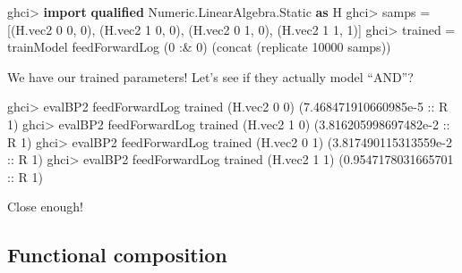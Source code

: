 \documentclass[]{article}
\newenvironment{Shaded}{}{}
\newcommand{\DataTypeTok}[1]{\textcolor[rgb]{0.56,0.13,0.00}{#1}}
\newcommand{\DecValTok}[1]{\textcolor[rgb]{0.25,0.63,0.44}{#1}}
\newcommand{\FloatTok}[1]{\textcolor[rgb]{0.25,0.63,0.44}{#1}}
\newcommand{\FunctionTok}[1]{\textcolor[rgb]{0.02,0.16,0.49}{#1}}
\newcommand{\KeywordTok}[1]{\textcolor[rgb]{0.00,0.44,0.13}{\textbf{#1}}}
\newcommand{\NormalTok}[1]{#1}
\newcommand{\OtherTok}[1]{\textcolor[rgb]{0.00,0.44,0.13}{#1}}
\begin{document}
\begin{Shaded}
\begin{Highlighting}[]
\NormalTok{ghci}\FunctionTok{>} \KeywordTok{import} \KeywordTok{qualified} \DataTypeTok{Numeric.LinearAlgebra.Static} \KeywordTok{as} \DataTypeTok{H}
\NormalTok{ghci}\FunctionTok{>}\NormalTok{ samps }\FunctionTok{=}\NormalTok{ [(H.vec2 }\DecValTok{0} \DecValTok{0}\NormalTok{, }\DecValTok{0}\NormalTok{), (H.vec2 }\DecValTok{1} \DecValTok{0}\NormalTok{, }\DecValTok{0}\NormalTok{), (H.vec2 }\DecValTok{0} \DecValTok{1}\NormalTok{, }\DecValTok{0}\NormalTok{), (H.vec2 }\DecValTok{1} \DecValTok{1}\NormalTok{, }\DecValTok{1}\NormalTok{)]}
\NormalTok{ghci}\FunctionTok{>}\NormalTok{ trained }\FunctionTok{=}\NormalTok{ trainModel feedForwardLog (}\DecValTok{0} \FunctionTok{:&} \DecValTok{0}\NormalTok{) (concat (replicate }\DecValTok{10000}\NormalTok{ samps))}
\end{Highlighting}
\end{Shaded}

We have our trained parameters! Let's see if they actually model ``AND''?

\begin{Shaded}
\begin{Highlighting}[]
\NormalTok{ghci}\FunctionTok{>}\NormalTok{ evalBP2 feedForwardLog trained (H.vec2 }\DecValTok{0} \DecValTok{0}\NormalTok{)}
\NormalTok{(}\FloatTok{7.468471910660985e-5}\OtherTok{ ::} \DataTypeTok{R} \DecValTok{1}\NormalTok{)}
\NormalTok{ghci}\FunctionTok{>}\NormalTok{ evalBP2 feedForwardLog trained (H.vec2 }\DecValTok{1} \DecValTok{0}\NormalTok{)}
\NormalTok{(}\FloatTok{3.816205998697482e-2}\OtherTok{ ::} \DataTypeTok{R} \DecValTok{1}\NormalTok{)}
\NormalTok{ghci}\FunctionTok{>}\NormalTok{ evalBP2 feedForwardLog trained (H.vec2 }\DecValTok{0} \DecValTok{1}\NormalTok{)}
\NormalTok{(}\FloatTok{3.817490115313559e-2}\OtherTok{ ::} \DataTypeTok{R} \DecValTok{1}\NormalTok{)}
\NormalTok{ghci}\FunctionTok{>}\NormalTok{ evalBP2 feedForwardLog trained (H.vec2 }\DecValTok{1} \DecValTok{1}\NormalTok{)}
\NormalTok{(}\FloatTok{0.9547178031665701}\OtherTok{ ::} \DataTypeTok{R} \DecValTok{1}\NormalTok{)}
\end{Highlighting}
\end{Shaded}

Close enough!

\hypertarget{functional-composition}{%
\subsection{Functional composition}\label{functional-composition}}
\end{document}
